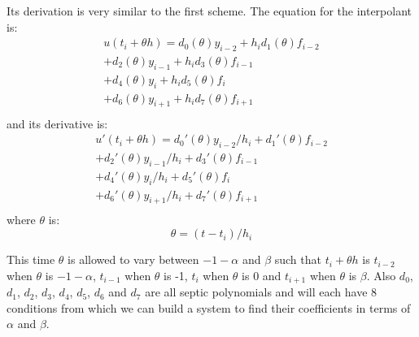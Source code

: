 \documentclass{article}
\begin{document}
Its derivation is very similar to the first scheme. The equation for the interpolant is:
\begin{equation}
\begin{split}
u(t_i + \theta h) = d_{0}(\theta)y_{i-2} +  h_id_{1}(\theta)f_{i-2} \\
+ d_{2}(\theta)y_{i-1}     +  h_id_{3}(\theta)f_{i-1} \\
+ d_{4}(\theta)y_i     +  h_id_{5}(\theta)f_i \\
+ d_{6}(\theta)y_{i + 1} + h_id_{7}(\theta)f_{i + 1} \\
\end{split}
\end{equation}
and its derivative is:
\begin{equation}
\begin{split}
u'(t_i + \theta h) = d_{0}'(\theta)y_{i-2}/h_i +  d_{1}'(\theta)f_{i-2} \\
+ d_{2}'(\theta)y_{i-1}/h_i   +  d_{3}'(\theta)f_{i-1} \\
+ d_{4}'(\theta)y_i/h_i       +  d_{5}'(\theta)f_i \\
+ d_{6}'(\theta)y_{i + 1}/h_i +  d_{7}'(\theta)f_{i + 1} \\
\end{split}
\end{equation}
where $\theta$ is:
\begin{equation}
\theta = (t - t_i) / h_i
\end{equation}

This time $\theta$ is allowed to vary between $-1-\alpha$ and $\beta$ such that $t_i + \theta h$ is $t_{i-2}$ when $\theta$ is $-1-\alpha$, $t_{i-1}$ when $\theta$ is -1, $t_i$ when $\theta$ is 0 and $t_{i + 1}$ when $\theta$ is $\beta$. Also $d_0$, $d_1$, $d_2$, $d_3$, $d_4$, $d_5$, $d_6$ and $d_7$ are all septic polynomials and will each have 8 conditions from which we can build a system to find their coefficients in terms of $\alpha$ and $\beta$.
\end{document}

